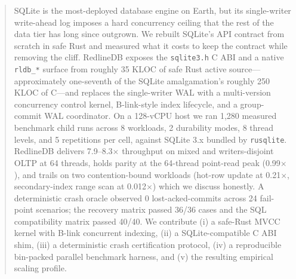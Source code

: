 \begin{abstract}
SQLite is the most-deployed database engine on Earth, but its
single-writer write-ahead log imposes a hard concurrency ceiling that
the rest of the data tier has long since outgrown. We rebuilt SQLite's
API contract from scratch in safe Rust and measured what it costs to
keep the contract while removing the cliff. RedlineDB exposes the
\texttt{sqlite3.h} C ABI and a native \texttt{rldb\_*} surface from
roughly 35 KLOC of safe Rust active source---approximately one-seventh
of the SQLite amalgamation's roughly 250 KLOC of C---and replaces the
single-writer WAL with a multi-version concurrency control kernel,
B-link-style index lifecycle, and a group-commit WAL coordinator. On a
128-vCPU host we ran 1{,}280 measured benchmark child runs across
8 workloads, 2 durability modes, 8 thread levels, and 5 repetitions per
cell, against SQLite 3.x bundled by \texttt{rusqlite}. RedlineDB
delivers 7.9--8.3$\times$ throughput on mixed and writers-disjoint
OLTP at 64 threads, holds parity at the 64-thread point-read peak
(0.99$\times$), and trails on two contention-bound workloads
(hot-row update at 0.21$\times$, secondary-index range scan at
0.012$\times$) which we discuss honestly. A deterministic crash
oracle observed 0 lost-acked-commits across 24 fail-point scenarios;
the recovery matrix passed 36/36 cases and the SQL compatibility
matrix passed 40/40. We contribute (i) a safe-Rust MVCC kernel with
B-link concurrent indexing, (ii) a SQLite-compatible C ABI shim, (iii)
a deterministic crash certification protocol, (iv) a reproducible
bin-packed parallel benchmark harness, and (v) the resulting empirical
scaling profile.
\end{abstract}
